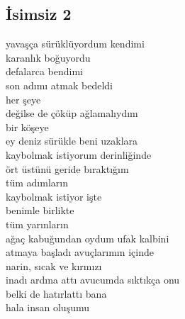 \subsection{İsimsiz 2}

yavaşça sürüklüyordum kendimi \\
karanlık boğuyordu \\
defalarca bendimi \\
son adımı atmak bedeldi \\
her şeye \\
değilse de çöküp ağlamalıydım \\
bir köşeye \\

\noindent\newline
ey deniz sürükle beni uzaklara \\
kaybolmak istiyorum derinliğinde \\
ört üstünü geride bıraktığım \\
tüm adımların \\
kaybolmak istiyor işte \\
benimle birlikte \\
tüm yarınların \\

\noindent\newline
ağaç kabuğundan oydum ufak kalbini \\
atmaya başladı avuçlarımın içinde \\
narin, sıcak ve kırmızı \\
inadı ardına attı avucumda sıktıkça onu \\
belki de hatırlattı bana \\
hala insan oluşumu \\